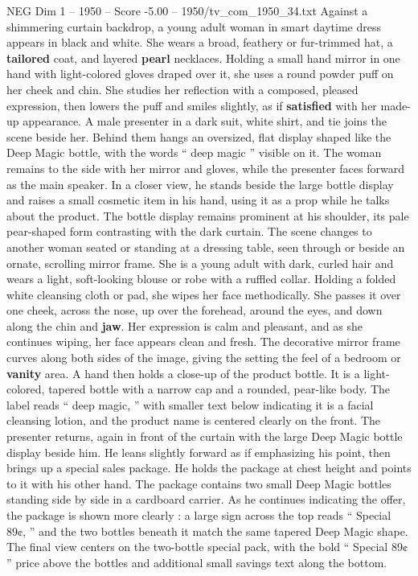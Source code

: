 \begin{textsample}{NEG Dim 1 – 1950 – Score -5.00 – 1950/tv\_com\_1950\_34.txt}  \label{ex:f1_neg_005}
Against a shimmering curtain backdrop, a young adult woman in smart daytime dress appears in black and white.
She wears a broad, feathery or fur-trimmed hat, a \textbf{tailored} coat, and layered \textbf{pearl} necklaces.
Holding a small hand mirror in one hand with light-colored gloves draped over it, she uses a round powder puff on her cheek and chin.
She studies her reflection with a composed, pleased expression, then lowers the puff and smiles slightly, as if \textbf{satisfied} with her made-up appearance.
A male presenter in a dark suit, white shirt, and tie joins the scene beside her.
Behind them hangs an oversized, flat display shaped like the Deep Magic bottle, with the words “ deep magic ” visible on it.
The woman remains to the side with her mirror and gloves, while the presenter faces forward as the main speaker.
In a closer view, he stands beside the large bottle display and raises a small cosmetic item in his hand, using it as a prop while he talks about the product.
The bottle display remains prominent at his shoulder, its pale pear-shaped form contrasting with the dark curtain.
The scene changes to another woman seated or standing at a dressing table, seen through or beside an ornate, scrolling mirror frame.
She is a young adult with dark, curled hair and wears a light, soft-looking blouse or robe with a ruffled collar.
Holding a folded white cleansing cloth or pad, she wipes her face methodically.
She passes it over one cheek, across the nose, up over the forehead, around the eyes, and down along the chin and \textbf{jaw}.
Her expression is calm and pleasant, and as she continues wiping, her face appears clean and fresh.
The decorative mirror frame curves along both sides of the image, giving the setting the feel of a bedroom or \textbf{vanity} area.
A hand then holds a close-up of the product bottle.
It is a light-colored, tapered bottle with a narrow cap and a rounded, pear-like body.
The label reads “ deep magic, ” with smaller text below indicating it is a facial cleansing lotion, and the product name is centered clearly on the front.
The presenter returns, again in front of the curtain with the large Deep Magic bottle display beside him.
He leans slightly forward as if emphasizing his point, then brings up a special sales package.
He holds the package at chest height and points to it with his other hand.
The package contains two small Deep Magic bottles standing side by side in a cardboard carrier.
As he continues indicating the offer, the package is shown more clearly : a large sign across the top reads “ Special 89¢, ” and the two bottles beneath it match the same tapered Deep Magic shape.
The final view centers on the two-bottle special pack, with the bold “ Special 89¢ ” price above the bottles and additional small savings text along the bottom.

\end{textsample}
